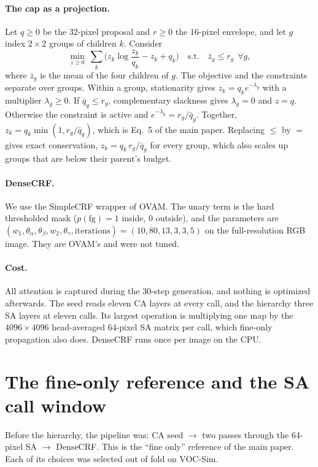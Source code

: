 \documentclass[10pt,twocolumn,letterpaper]{article}
\begin{document}
\paragraph{The cap as a projection.}
Let $q\ge0$ be the 32-pixel proposal and $r\ge0$ the 16-pixel envelope, and let $g$ index $2\times2$ groups of children $k$. Consider
\begin{equation}
\min_{z\ge0}\ \sum_k\Big(z_k\log\frac{z_k}{q_k}-z_k+q_k\Big)\quad\text{s.t.}\quad\bar z_g\le r_g\ \ \forall g,
\label{eq:s_proj}
\end{equation}
where $\bar z_g$ is the mean of the four children of $g$. The objective and the constraints separate over groups. Within a group, stationarity gives $z_k=q_k e^{-\lambda_g}$ with a multiplier $\lambda_g\ge0$. If $\bar q_g\le r_g$, complementary slackness gives $\lambda_g=0$ and $z=q$. Otherwise the constraint is active and $e^{-\lambda_g}=r_g/\bar q_g$. Together, $z_k=q_k\min(1,r_g/\bar q_g)$, which is Eq.~5 of the main paper. Replacing $\le$ by $=$ gives exact conservation, $z_k=q_k\,r_g/\bar q_g$ for every group, which also scales up groups that are below their parent's budget.

\paragraph{DenseCRF.}
We use the SimpleCRF wrapper of OVAM. The unary term is the hard thresholded mask ($p(\text{fg}){=}1$ inside, 0 outside), and the parameters are $(w_1,\theta_\alpha,\theta_\beta,w_2,\theta_\gamma,\text{iterations})=(10,80,13,3,3,5)$ on the full-resolution RGB image. They are OVAM's and were not tuned.

\paragraph{Cost.}
All attention is captured during the 30-step generation, and nothing is optimized afterwards. The seed reads eleven CA layers at every call, and the hierarchy three SA layers at eleven calls. Its largest operation is multiplying one map by the $4096\times4096$ head-averaged 64-pixel SA matrix per call, which fine-only propagation also does. DenseCRF runs once per image on the CPU.

\section{The fine-only reference and the SA call window}
\label{sec:s_baseline}
Before the hierarchy, the pipeline was: CA seed $\rightarrow$ two passes through the 64-pixel SA $\rightarrow$ DenseCRF. This is the ``fine only'' reference of the main paper. Each of its choices was selected out of fold on VOC-Sim.
\end{document}
